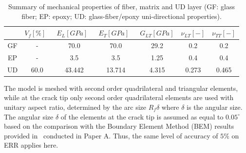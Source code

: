 \begin{table}[!h]
 \centering
 \caption{Summary of mechanical properties of fiber, matrix and UD layer (GF: glass fiber; EP: epoxy; UD: glass-fiber/epoxy uni-directional properties).}%
 \begin{tabular}{ccccccc}
\\
\small& \small\textbf{$V_{f}\left[\%\right]$}\  &\small \textbf{$E_{L}\left[GPa\right]$}\ & \small\textbf{$E_{T}\left[GPa\right]$}\  & \small\textbf{$G_{LT}\left[GPa\right]$} &\small\textbf{$\nu_{LT}\left[-\right]$} &\small \textbf{$\nu_{TT}\left[-\right]$} \\
\midrule
\small GF &\small-   &\small 70.0 &\small 70.0  &\small 29.2 &\small 0.2  &\small 0.2\\
\small EP    &-&\small 3.5 &\small 3.5   &\small 1.25 &\small  0.4&\small 0.4\\
\small UD&\small60.0&\small43.442&\small13.714&\small 4.315&\small 0.273&\small0.465\\
\end{tabular}
\label{chap3:paperC:tab:phaseprop}
\end{table}

The model is meshed with second order quadrilateral and triangular elements, while at the crack tip only second order quadrilateral elements are used with unitary aspect ratio, determined by the arc size $R_{f}\delta$ where $\delta$ is the angular size. The angular size $\delta$ of the elements at the crack tip is assumed as equal to $0.05^{\circ}$ based on the comparison with the Boundary Element Method (BEM) results provided in~\cite{Paris2007,Sandino2016} conducted in Paper A. Thus, the same level of accuracy of $5\%$ on ERR applies here.

